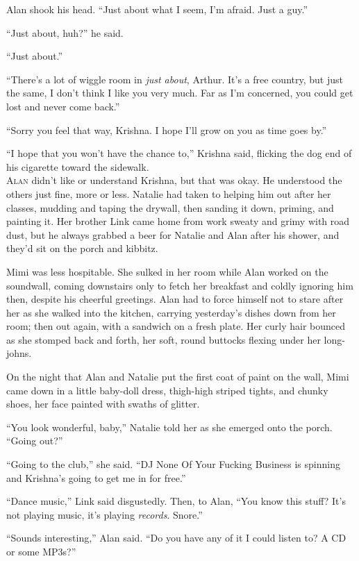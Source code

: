 Alan shook his head.  ``Just about what I seem, I'm afraid.  Just a
guy.''

``Just about, huh?'' he said.

``Just about.''

``There's a lot of wiggle room in \textit{just about}, Arthur.  It's a
free country, but just the same, I don't think I like you very much. 
Far as I'm concerned, you could get lost and never come back.''

``Sorry you feel that way, Krishna.  I hope I'll grow on you as time
goes by.''

``I hope that you won't have the chance to,'' Krishna said, flicking
the dog end of his cigarette toward the sidewalk.
\\
\lettrine[lines=3, lhang=.5, nindent=0pt, findent=2pt]{A}{lan} didn't like or understand Krishna, but that was okay.  He
understood the others just fine, more or less.  Natalie had taken to
helping him out after her classes, mudding and taping the drywall,
then sanding it down, priming, and painting it.  Her brother Link came
home from work sweaty and grimy with road dust, but he always grabbed
a beer for Natalie and Alan after his shower, and they'd sit on the
porch and kibbitz.

Mimi was less hospitable.  She sulked in her room while Alan worked on
the soundwall, coming downstairs only to fetch her breakfast and
coldly ignoring him then, despite his cheerful greetings.  Alan had to
force himself not to stare after her as she walked into the kitchen,
carrying yesterday's dishes down from her room; then out again, with a
sandwich on a fresh plate.  Her curly hair bounced as she stomped back
and forth, her soft, round buttocks flexing under her long-johns.

On the night that Alan and Natalie put the first coat of paint on the
wall, Mimi came down in a little baby-doll dress, thigh-high striped
tights, and chunky shoes, her face painted with swaths of glitter.

``You look wonderful, baby,'' Natalie told her as she emerged onto the
porch.  ``Going out?''

``Going to the club,'' she said.  ``DJ None Of Your Fucking Business
is spinning and Krishna's going to get me in for free.''

``Dance music,'' Link said disgustedly.  Then, to Alan, ``You know
this stuff?  It's not playing music, it's playing \textit{records}. 
Snore.''

``Sounds interesting,'' Alan said.  ``Do you have any of it I could
listen to?  A CD or some MP3s?''

